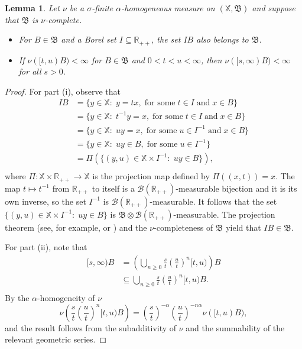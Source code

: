 \documentclass[12pt]{amsart}
\numberwithin{equation}{section}
\numberwithin{figure}{section}
\theoremstyle{plain} \newtheorem{theorem}{Theorem}[section]
\theoremstyle{plain} \newtheorem{proposition}[theorem]{Proposition}
\theoremstyle{plain} \newtheorem{lemma}[theorem]{Lemma}
\theoremstyle{plain} \newtheorem{corollary}[theorem]{Corollary}
\theoremstyle{definition} \newtheorem{definition}[theorem]{Definition}
\theoremstyle{definition} \newtheorem{notation}[theorem]{Notation}
\theoremstyle{remark} \newtheorem{remark}[theorem]{Remark}
\theoremstyle{remark} \newtheorem{example}[theorem]{Example}
\theoremstyle{definition} \newtheorem{assumption}{Assumption}
\newcommand{\bR}{\mathbb{R}}
\newcommand{\bX}{\mathbb{X}}
\newcommand{\cB}{\mathcal{B}}
\newcommand{\salg}{\mathfrak{B}}
\begin{document}
\begin{lemma}
  \label{lemma:projection}
  Let $\nu$ be a $\sigma$-finite $\alpha$-homogeneous measure on
  $(\bX, \salg)$ and suppose that $\salg$ is $\nu$-complete.
  \begin{itemize}
  \item[i)] For $B \in \salg$ and a Borel set $I \subseteq \bR_{++}$,
    the set $I B$ also belongs to $\salg$.
  \item[ii)] If $\nu([t,u) B) < \infty$ for $B \in \salg$ and $0 < t <
    u < \infty$, then $\nu([s,\infty) B) < \infty$ for all $s > 0$.
\end{itemize}
\end{lemma}
\begin{proof}
  For part (i), observe that
  \[
  \begin{split}
    I B    
    & =
    \{y \in \bX : \; y = t x, \; \text{for some} \; t \in I \; \text{and} \; x \in B\} \\  
    & =
    \{y \in \bX : \; t^{-1} y = x, \; \text{for some} \; t \in I \; \text{and} \; x \in B\} \\ 
    & =
    \{y \in \bX : \; u y = x, \; \text{for some} \; u \in I^{-1} \; \text{and} \; x \in B\} \\ 
    & =
    \{y \in \bX : \; u y \in B, \; \text{for some} \; u \in I^{-1}\} \\
    & =
    \Pi(\{(y,u) \in \bX \times I^{-1}: \; u y\in B\}), \\
  \end{split}
  \]
  where $\Pi: \bX \times \bR_{++} \to \bX$ is the projection map
  defined by $\Pi((x,t)) = x$.  The map $t \mapsto t^{-1}$ from
  $\bR_{++}$ to itself is a $\cB(\bR_{++})$-measurable bijection and
  it is its own inverse, so the set $I^{-1}$ is
  $\cB(\bR_{++})$-measurable.  It follows that the set $\{(y,u) \in
  \bX \times I^{-1} :\; u y\in B\}$ is $\salg \otimes
  \cB(\bR_{++})$-measurable.  The projection theorem (see,
  for example, \cite[Th.~12.3.4]{MR752692} or \cite[Section~III.44]{MR521810})
  and the $\nu$-completeness of $\salg$ yield that $I B \in \salg$.

  For part (ii), note that 
  \[
  \begin{split}
    [s,\infty) B 
    & = \left(\bigcup_{n \geq0} \frac{s}{t} \left(\frac{u}{t}\right)^n [t,u)\right) B \\
    & \subseteq \bigcup_{n \geq0} \frac{s}{t} \left(\frac{u}{t}\right)^n [t,u) B. \\
  \end{split}
  \]
  By the $\alpha$-homogeneity of $\nu$
  \[
  \nu\left(\frac{s}{t} \left(\frac{u}{t}\right)^n [t,u) B\right)
  =
  \left(\frac{s}{t}\right)^{-\alpha} \left(\frac{u}{t}\right)^{-n \alpha} \nu([t,u) B),
  \]
  and the result follows from the subadditivity of $\nu$ and the
  summability of the relevant geometric series.
\end{proof}
\end{document}
